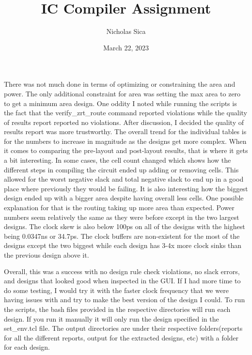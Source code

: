 \documentclass{article}
\title{IC Compiler Assignment}
\author{Nicholas Sica}
\date{March 22, 2023}
\begin{document}
\maketitle

There was not much done in terms of optimizing or constraining the area and
power. The only additional constraint for area was setting the max area to zero
to get a minimum area design. One oddity I noted while running the scripts is
the fact that the verify\_zrt\_route command reported violations while the
quality of results report reported no violations. After discussion, I decided
the quality of results report was more trustworthy. The overall trend for the
individual tables is for the numbers to increase in magnitude as the designs get
more complex. When it comes to comparing the pre-layout and post-layout results,
that is where it gets a bit interesting. In some cases, the cell count changed
which shows how the different steps in compiling the circuit ended up adding or
removing cells. This allowed for the worst negative slack and total negative
slack to end up in a good place where previously they would be failing. It is
also interesting how the biggest design ended up with a bigger area despite
having overall less cells. One possible explanation for that is the routing
taking up more area than expected. Power numbers seem relatively the same as
they were before except in the two largest designs. The clock skew is also below
100ps on all of the designs with the highest being 0.0347ns or 34.7ps. The clock
buffers are non-existent for the most of the designs except the two biggest
while each design has 3-4x more clock sinks than the previous design above it.

Overall, this was a success with no design rule check violations, no slack
errors, and designs that looked good when inspected in the GUI. If I had more
time to do some testing, I would try it with the faster clock frequency that we
were having issues with and try to make the best version of the design I
could. To run the scripts, the bash files provided in the respective directories
will run each design. If you run it manually it will only run the design
specified in the set\_env.tcl file. The output directories are under their
respective folders(reports for all the different reports, output for the
extracted designs, etc) with a folder for each design.
\end{document}
